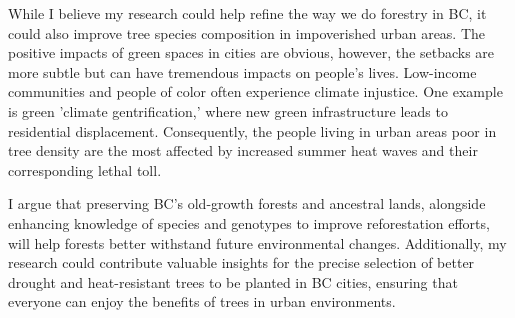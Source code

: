 \documentclass[11pt,letter]{article}
\begin{document}
While I believe my research could help refine the way we do forestry in BC, it could also improve tree species composition in impoverished urban areas. The positive impacts of green spaces in cities are obvious, however, the setbacks are more subtle but can have tremendous impacts on people's lives. Low-income communities and people of color often experience climate injustice. One example is green 'climate gentrification,' where new green infrastructure leads to residential displacement. \citep{anguelovski_why_2019} Consequently, the people living in urban areas poor in tree density are the most affected by increased summer heat waves and their corresponding lethal toll. \citep{anguelovski_why_2019}

I argue that preserving BC's old-growth forests and ancestral lands, alongside enhancing knowledge of species and genotypes to improve reforestation efforts, will help forests better withstand future environmental changes. Additionally, my research could contribute valuable insights for the precise selection of better drought and heat-resistant trees to be planted in BC cities, ensuring that everyone can enjoy the benefits of trees in urban environments.
\end{document}
